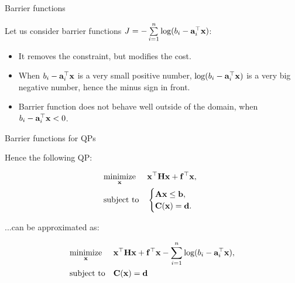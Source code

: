 \documentclass{beamer}
\begin{document}
\begin{frame}{Barrier functions}
\begin{flushleft}

Let us consider barrier functions $J = -\sum\limits_{i = 1}^n \text{log} (b_i - \mathbf{a}_i^\top \mathbf{x})$:

\begin{itemize}
    \item It removes the constraint, but modifies the cost.
    \item When $b_i - \mathbf{a}_i^\top \mathbf{x}$ is a very small positive number, $\text{log} (b_i - \mathbf{a}_i^\top \mathbf{x})$ is a very big negative number, hence the minus sign in front.
    \item Barrier function does not behave well outside of the domain, when $b_i - \mathbf{a}_i^\top \mathbf{x} < 0$.
\end{itemize}
 
\end{flushleft}
\end{frame}




\begin{frame}{Barrier functions for QPs}
\begin{flushleft}

Hence the following QP:

\begin{equation}
\begin{aligned}
& \underset{\mathbf{x}}{\text{minimize}}
& & \mathbf{x}^\top \mathbf{H} \mathbf{x} + \mathbf{f}^\top \mathbf{x}, \\
& \text{subject to}
& & \begin{cases}
    \mathbf{A}\mathbf{x} \leq \mathbf{b}, \\
    \mathbf{C}(\mathbf{x}) = \mathbf{d}.
    \end{cases}
\end{aligned}
\end{equation}
 
...can be approximated as:

\begin{equation}
\begin{aligned}
& \underset{\mathbf{x}}{\text{minimize}}
& & \mathbf{x}^\top \mathbf{H} \mathbf{x} + \mathbf{f}^\top \mathbf{x} - \sum\limits_{i = 1}^n \text{log} (b_i - \mathbf{a}_i^\top \mathbf{x}), \\
& \text{subject to}
& & \mathbf{C}(\mathbf{x}) = \mathbf{d}
\end{aligned}
\end{equation}
 
\end{flushleft}
\end{frame}
\end{document}
